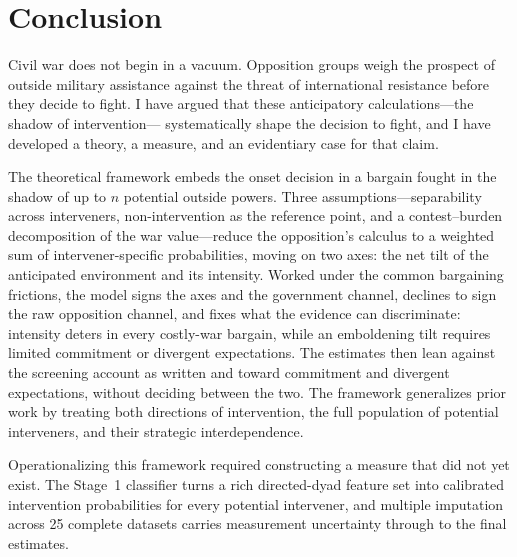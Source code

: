 
\section{Conclusion}

Civil war does not begin in a vacuum.  Opposition groups weigh the
prospect of outside military assistance against the threat of
international resistance before they decide to fight.  I have argued
that these anticipatory calculations---the shadow of intervention---
systematically shape the decision to fight, and I have developed a theory,
a measure, and an evidentiary case for that claim.

The theoretical framework embeds the onset decision in a bargain fought in
the shadow of up to $n$ potential outside powers.  Three
assumptions---separability across interveners, non-intervention as the
reference point, and a contest--burden decomposition of the war
value---reduce the opposition's calculus to a weighted sum of
intervener-specific probabilities, moving on two axes: the net tilt of the
anticipated environment and its intensity.  Worked under the common
bargaining frictions, the model signs the axes and the government channel,
declines to sign the raw opposition channel, and fixes what the evidence can
discriminate: intensity deters in every costly-war bargain, while an
emboldening tilt requires limited commitment or divergent expectations.  The
estimates then lean against the screening account as written and toward
commitment and divergent expectations, without deciding between the two.
The framework generalizes prior work by treating both directions of
intervention, the full population of potential interveners, and their
strategic interdependence.

Operationalizing this framework required constructing a measure that did
not yet exist.  The Stage~1 classifier turns a rich directed-dyad feature
set into calibrated intervention probabilities for every potential
intervener, and multiple imputation across 25 complete datasets carries
measurement uncertainty through to the final estimates.

